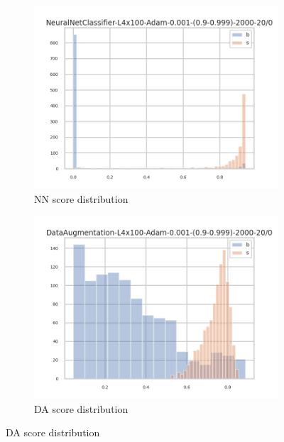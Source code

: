 \begin{figure}[ht!]
  \centering
  \begin{subfigure}[t]{0.49\linewidth}
    \includegraphics[width=\linewidth]{GG-prior/NN/valid_distrib.png}
    \caption{NN score distribution}
  \end{subfigure}%
  \hfill
  \begin{subfigure}[t]{0.49\linewidth}
    \includegraphics[width=\linewidth]{GG-prior/DA/valid_distrib.png}
    \caption{DA score distribution}
  \end{subfigure}


\end{figure}
